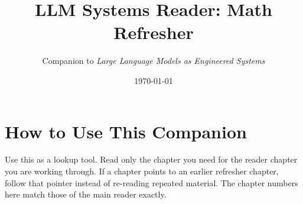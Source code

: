 \documentclass[11pt,openany]{book}
\title{LLM Systems Reader: Math Refresher}
\author{Companion to \emph{Large Language Models as Engineered Systems}}
\date{\today}
\begin{document}
\frontmatter

\maketitle
\tableofcontents

\chapter*{How to Use This Companion}

Use this as a lookup tool. Read only the chapter you need for the reader chapter you are working through. If a chapter points to an earlier refresher chapter, follow that pointer instead of re-reading repeated material. The chapter numbers here match those of the main reader exactly.

\mainmatter

















\backmatter
\end{document}
